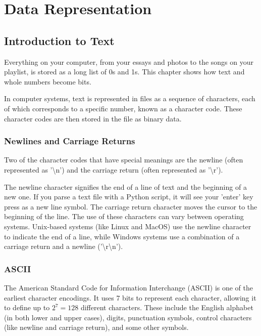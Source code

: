 \chapter{Data Representation}


\section{Introduction to Text}
Everything on your computer, from your essays and photos to the songs on
your playlist, is stored as a long list of 0s and 1s. This chapter shows
how text and whole numbers become bits.

In computer systems, text is represented in files as a sequence of
characters, each of which corresponds to a specific number, known as a
character code. These character codes are then stored in the file as
binary data.

\subsection{Newlines and Carriage Returns}

Two of the character codes that have special meanings are the newline
(often represented as '\textbackslash n') and the carriage return
(often represented as '\textbackslash r').

The newline character signifies the end of a line of text and the
beginning of a new one. If you parse a text file with a Python script, it will see your 'enter' key press as a new line symbol. 
The carriage return character moves the cursor
to the beginning of the line. The use of these characters can vary
between operating systems. Unix-based systems (like Linux and MacOS)
use the newline character to indicate the end of a line, while Windows
systems use a combination of a carriage return and a newline
('\textbackslash r\textbackslash n').
\subsection{ASCII}

The American Standard Code for Information Interchange (ASCII) is one
of the earliest character encodings. It uses 7 bits to represent each
character, allowing it to define up to $2^7 = 128$ different
characters. These include the English alphabet (in both lower and
upper cases), digits, punctuation symbols, control characters (like
newline and carriage return), and some other symbols.

